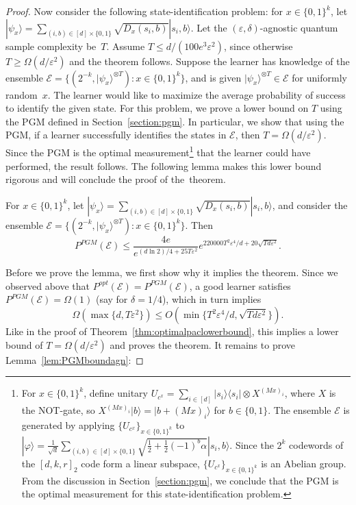 \documentclass[twoside,11pt]{article}
\newcommand{\eps}{\varepsilon}
\newcommand{\ket}[1]{|#1\rangle}
\newcommand{\ketbra}[2]{|#1\rangle\! \langle #2|}
\newcommand{\E}{\mathcal{E}}
\newcommand{\ph}{\ensuremath{\varphi}}
\def\01{\{0,1\}}
\begin{document}
\begin{proof}
	Now consider the following state-identification problem: for $x\in \01^k$, let $\ket{\psi_x}=\sum_{(i,b)\in [d]\times \01} \sqrt{D_x(s_i,b)} \ket{s_i, b}$. Let the $(\eps,\delta)$-agnostic quantum sample complexity be~$T$. Assume $T\leq d/(100e^3 \eps^2)$, since otherwise $T\geq \Omega(d/\eps^2)$ and the theorem follows.  Suppose the learner has knowledge of the ensemble $\E=\{(2^{-k},\ket{\psi_x}^{\otimes T}):x\in \01^k\}$, and is given $\ket{\psi_{x}}^{\otimes T} \in \E$ for uniformly random~$x$. The learner would like to maximize the average probability of success to identify the given state. For this problem, we prove a lower bound on $T$ using the PGM defined in Section~\ref{section:pgm}. In particular, we show that using the PGM, if a learner successfully identifies the states in $\E$, then $T=\Omega(d/\eps^2)$. Since the PGM is the optimal measurement\footnote{For $x\in\01^k$, define unitary $U_{c^x}=\sum_{i\in [d]} \ketbra{s_i}{s_i}\otimes X^{(Mx)_i}$, where $X$ is the NOT-gate, so $X^{(Mx)_i}\ket{b}=\ket{b+(Mx)_i}$ for $b\in \01$. The ensemble $\E$ is generated by applying $\{U_{c^x}\}_{x\in \01^k}$ to $\ket{\ph}=\frac{1}{\sqrt{d}}\sum_{(i,b)\in [d]\times \01} \sqrt{\frac{1}{2}+\frac{1}{2}(-1)^{b}\alpha}\ket{s_i,b}$. Since the $2^k$ codewords of the $[d,k,r]_2$ code form a linear subspace, $\{U_{c^x}\}_{x\in \01^k}$ is an Abelian group. From the discussion in Section~\ref{section:pgm}, we conclude that the PGM is the optimal measurement for this state-identification problem.} that the learner could have performed, the result follows. The following lemma makes this lower bound rigorous and will conclude the proof of the~theorem. 
	
	\begin{lemma}\label{lem:PGMboundagn}
		For $x\in \01^k$, let  $\ket{\psi_x}=\sum_{(i,b)\in [d]\times \01} \sqrt{D_x(s_i,b)} \ket{s_i, b}$, and consider the ensemble $\E=\{(2^{-k},\ket{\psi_x}^{\otimes T}):x\in \01^k\}$. Then
		$$
		P^{PGM} (\E)\leq \frac{4e}{e^{(d\ln 2)/4+25T\eps^2}} e^{220000T^2\eps^4/d+20\sqrt{Td \eps^2}}.
		$$
	\end{lemma}
	Before we prove the lemma, we first show why it implies the theorem. Since we observed above that $P^{opt}(\E)=P^{PGM}(\E)$, a good learner satisfies $P^{PGM}(\E)=\Omega(1)$ (say for $\delta=1/4$), which in turn implies
	$$
	\Omega(\max\{d,T\eps^2\})\leq O(\min\{T^2\eps^4/d,\sqrt{Td\eps^2}\}).
	$$
	Like in the proof of Theorem~\ref{thm:optimalpaclowerbound}, this implies a lower bound of $T=\Omega(d/\eps^2)$ and proves the theorem. It remains to prove Lemma~\ref{lem:PGMboundagn}:
	

\end{proof}
\end{document}
